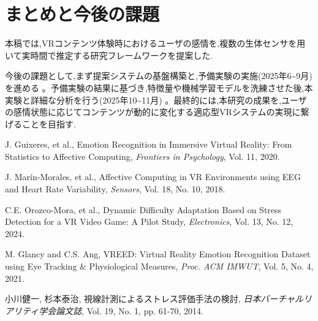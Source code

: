 \documentclass[paper=a4paper,fontsize=10pt,jafontscale=0.925,twocolumn]{jlreq}
\begin{document}
\section{まとめと今後の課題}

本稿では,VRコンテンツ体験時におけるユーザの感情を,複数の生体センサを用いて実時間で推定する研究フレームワークを提案した.

今後の課題として,まず提案システムの基盤構築と,予備実験の実施(2025年6\textasciitilde9月)を進める 。予備実験の結果に基づき,特徴量や機械学習モデルを洗練させた後,本実験と詳細な分析を行う(2025年10\textasciitilde11月) 。最終的には,本研究の成果を,ユーザの感情状態に応じてコンテンツが動的に変化する適応型VRシステムの実現に繋げることを目指す.

\begin{thebibliography}{9}

J. Guixeres, et al., Emotion Recognition in Immersive Virtual Reality: From Statistics to Affective Computing, \textit{Frontiers in Psychology}, Vol. 11, 2020. 

J. Marín-Morales, et al., Affective Computing in VR Environments using EEG and Heart Rate Variability, \textit{Sensors}, Vol. 18, No. 10, 2018. 

C.E. Orozco-Mora, et al., Dynamic Difficulty Adaptation Based on Stress Detection for a VR Video Game: A Pilot Study, \textit{Electronics}, Vol. 13, No. 12, 2024. 

M. Glancy and C.S. Ang, VREED: Virtual Reality Emotion Recognition Dataset using Eye Tracking \& Physiological Measures, \textit{Proc. ACM IMWUT}, Vol. 5, No. 4, 2021. 

小川健一, 杉本泰治, 視線計測によるストレス評価手法の検討, \textit{日本バーチャルリアリティ学会論文誌}, Vol. 19, No. 1, pp. 61-70, 2014. 

\end{thebibliography}
\end{document}
